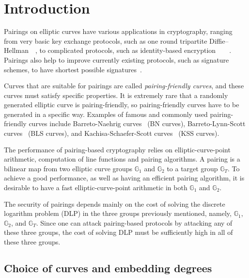 \section{Introduction}
\label{sec:intro}

Pairings on elliptic curves have various applications in cryptography,
ranging from very basic key exchange protocols,
such as one round tripartite Diffie--Hellman~\cite{2000/joux-ants}~\cite{2004/joux-tripartite},
to complicated protocols, such as
identity-based encryption~\cite{2001/boneh}~\cite{2002/horwitz}~\cite{2002/gentry}~\cite{2005/sahai}.
Pairings also help to improve currently existing protocols, 
such as signature schemes, to have shortest possible signatures~\cite{2004/boneh}.

Curves that are suitable for pairings are called {\emph{pairing-friendly curves}},
and these curves must satisfy specific properties.
It is extremely rare that a randomly generated elliptic curve is pairing-friendly,
so pairing-friendly curves have to be generated in a specific way.
Examples of famous and commonly used pairing-friendly curves include 
Barreto-Naehrig curves~\cite{2006/barreto} (BN curves),
Barreto-Lynn-Scott curves~\cite{2003/bls} (BLS curves), and
Kachisa-Schaefer-Scott curves~\cite{2008/kss} (KSS curves).

The performance of pairing-based cryptography relies on
elliptic-curve-point arithmetic, computation of line functions and pairing algorithms.
A pairing is a bilinear map from two elliptic curve groups $\mathbb{G}_1$ and $\mathbb{G}_2$ to
a target group $\mathbb{G}_T$.
To achieve a good performance, as well as having an efficient pairing algorithm,
it is desirable to have a fast elliptic-curve-point arithmetic in both $\mathbb{G}_1$ and $\mathbb{G}_2$.

The security of pairings depends mainly on the cost of solving the discrete logarithm problem (DLP) in the three groups previously mentioned,
namely, $\mathbb{G}_1$, $\mathbb{G}_2$, and $\mathbb{G}_T$.
Since one can attack pairing-based protocols by attacking any of these three groups,
the cost of solving DLP must be sufficiently high in all of these three groups.


\subsection{Choice of curves and embedding degrees}


